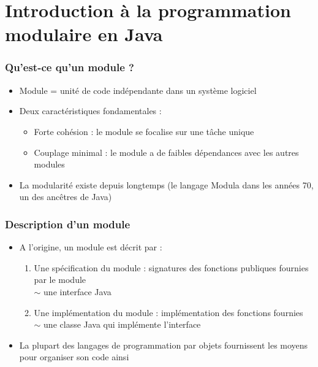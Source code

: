 \documentclass{beamer}
\begin{document}
\section{Introduction à la programmation modulaire en Java}

\begin{frame}
  \frametitle{Qu'est-ce qu'un module ?}  
  \begin{itemize}
  \item Module = unité de code indépendante dans un système logiciel
  \item Deux caractéristiques fondamentales :
    \begin{itemize}
    \item Forte cohésion : le module se focalise sur une tâche unique
    \item Couplage minimal : le module a de faibles dépendances avec les
      autres modules
    \end{itemize}
  \item La modularité existe depuis longtemps (le langage Modula dans
    les années 70, un des ancêtres de Java)    
  \end{itemize}
\end{frame}

\begin{frame}
  \frametitle{Description d'un module}  
  \begin{itemize}
  \item A l'origine, un module est décrit par :
    \begin{enumerate}
    \item Une spécification du module : signatures des fonctions publiques
	fournies par le module\\
        $\sim$ une interface Java
      \item Une implémentation du module : implémentation des
        fonctions fournies\\
        $\sim$ une classe Java qui implémente l'interface
      \end{enumerate}
    \item La plupart des langages de programmation par objets
      fournissent les moyens pour organiser son code ainsi
  \end{itemize}
\end{frame}
\end{document}
